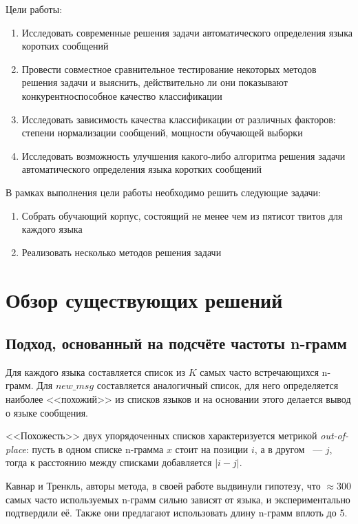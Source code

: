 \documentclass[a4paper, 14pt]{article}
\begin{document}
		
		Цели работы:
		\begin{enumerate}
			\item Исследовать современные решения задачи автоматического определения языка коротких сообщений
			\item Провести совместное сравнительное тестирование некоторых методов решения задачи и выяснить, действительно ли они показывают
			конкурентноспособное качество классификации
			\item Исследовать зависимость качества классификации от различных факторов: степени нормализации сообщений, мощности обучающей 
			выборки
			\item Исследовать возможность улучшения какого-либо алгоритма решения задачи автоматического определения языка коротких сообщений	
		\end{enumerate}
		В рамках выполнения цели работы необходимо решить следующие задачи:
		\begin{enumerate}
			\item Собрать обучающий корпус, состоящий не менее чем из пятисот твитов для каждого языка
			\item Реализовать несколько методов решения задачи
		\end{enumerate}

\pagebreak

\section{Обзор существующих решений}
		\subsection{Подход, основанный на подсчёте частоты n-грамм}
		Для каждого языка составляется список из $K$ самых часто встречающихся n-грамм. Для $new\_msg$ составляется аналогичный список, для него
		определяется наиболее <<похожий>> из списков языков
		и на основании этого делается вывод о языке сообщения. 
		
		<<Похожесть>> двух упорядоченных списков характеризуется метрикой \textit{out-of-place}: 
		пусть в одном списке n-грамма $x$ стоит на позиции $i$, а в другом \nolinebreak~--- $j$, тогда к расстоянию между списками добавляется $|i - j|$.
		
		
		Кавнар и Тренкль, авторы метода, в своей работе \cite{canvar} выдвинули гипотезу, что $ \approx 300$ самых часто используемых n-грамм сильно зависят
		от языка, и экспериментально подтвердили её. Также они предлагают использовать длину n-грамм вплоть до 5.
		
\end{document}
